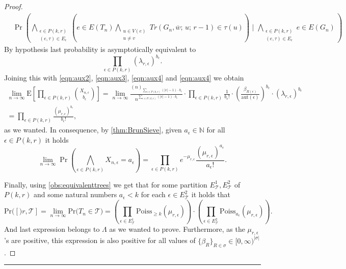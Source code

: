 \documentclass[12pt,notitlepage,a4paper]{article}
\theoremstyle{definition}
\newcommand{\N}{\mathbb{N}}
\newcommand{\Ln}{\lim\limits_{n\to \infty}}
\newcommand{\PR}[1]{\mathrm{Pr}\big(#1\big)}
\newcommand{\sep}{\noindent\rule{2cm}{0.4pt}}
\newcommand{\aut}{\mathrm{aut}}
\begin{document}
\begin{proof}
\begin{align}
	&
	\Pr\left(
	\bigwedge_{\substack{
			\epsilon\in P(k,r)\\
			(e, \tau)\in E_{\epsilon}
	}} \left(
	e\in E(T_n) \bigwedge_{\substack{
	u\in V(e)\\
	u\neq v}}
	Tr(G_n,\overline{w};\, u;\, r-1)\in \tau(u)		
	\right)\, \, \Big| 
	\, \,
	\bigwedge_{\substack{
	\epsilon\in P(k,r)\\
	(e, \tau)\in E_{\epsilon}
	}} e\in E(G_n)\,
	\right)
	\end{align}
	By hypothesis last probability is asymptotically equivalent
	to
	\[
	\prod_{\epsilon\in P(k,r)} (\lambda_{r,\epsilon})^{b_\epsilon}.
	\]
	Joining this with \cref{eqn:aux2},
	\cref{eqn:aux3}, \cref{eqn:aux4} and \cref{eqn:aux4} we obtain 
	\begin{align*} 
	\Ln
	\mathrm{E}
	\left[
	\prod_{\epsilon\in P(k,r)} \binom{X_{n,\epsilon}}{b_\epsilon}	
	\right]
	= \Ln  
	\frac{(n)_{\sum_{\epsilon\in P(k,r)}(|\epsilon|-1)\cdot b_\epsilon}}
	{n^{\sum_{\epsilon\in P(k,r)}(|\epsilon|-1)\cdot b_\epsilon}}
	\cdot
	\prod_{\epsilon\in P(k,r)}
	\frac{1}{b_\epsilon!} \cdot
	\left( \frac{\beta_{R(\epsilon)}}{\aut(\epsilon)} \right)^
	{b_\epsilon} \cdot 
	(\lambda_{r,\epsilon})^{b_\epsilon}&\\
	= \prod_{\epsilon\in P(k,r)}
	\frac{\left( \mu_{r,\epsilon} \right)^
	{b_\epsilon}}{b_\epsilon!}
	,&
	\end{align*}
	as we wanted. In consequence, by \cref{thm:BrunSieve},
	given $a_{\epsilon}\in \N$ for all $\epsilon\in P(k,r)$
	it holds
	\[
	\Ln
	\Pr\left( 
	\bigwedge_{\epsilon \in P(k,r)} X_{n,\epsilon}=a_\epsilon
	\right)=
	\prod_{\epsilon\in P(k,r)} e^{-\mu_{r,\epsilon}}
	\frac{(\mu_{r,\epsilon})^{a_\epsilon}}{a_\epsilon!}.
	\]

	Finally, using \cref{obs:equivalenttrees} we get that for some
	partition $E^1_\mathcal{T}, E^2_\mathcal{T}$ of $P(k,r)$ and 
	some natural numbers $a_\epsilon<k$ for each 
	$\epsilon\in E^2_\mathcal{T}$ it holds that
	\[ \PR[r,\mathcal{T}]=
	\Ln \PR{T_n\in \mathcal{T}}= 
	\left(
	\prod_{\epsilon\in E^1_\mathcal{T}} \mathrm{Poiss}_{\geq k}(\mu_{r,\epsilon}) 
	\right)\cdot
	\left(
	\prod_{\epsilon\in E^2_\mathcal{T}}
	\mathrm{Poiss}_{a_\epsilon}(\mu_{r,\epsilon}) 
	\right).
	\]
	And last expression belongs to $\Lambda$ as we wanted to prove. Furthermore,
	as the $\mu_{r,\epsilon}$'s are positive, this expression is also 
	positive for all values of
	$\{ \beta_R \}_{R\in \sigma}\in [0,\infty)^{|\sigma|}$.
 	\end{proof}
\sep
\end{document}
